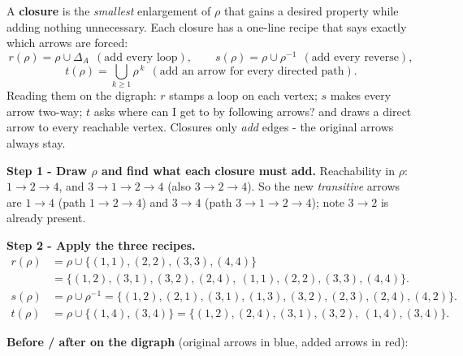 \documentclass[11pt,a4paper]{article}
\begin{document}
\begin{ideabox}
A \textbf{closure} is the \emph{smallest} enlargement of $\rho$ that gains a desired property while
adding nothing unnecessary. Each closure has a one-line recipe that says exactly which arrows are
\textquotedbl{}forced\textquotedbl{}:
\[
r(\rho)=\rho\cup\Delta_A\ \ (\text{add every loop}),\qquad
s(\rho)=\rho\cup\rho^{-1}\ \ (\text{add every reverse}),
\]
\[
t(\rho)=\bigcup_{k\ge1}\rho^{\,k}\ \ (\text{add an arrow for every directed path}).
\]
Reading them on the digraph: $r$ stamps a loop on each vertex; $s$ makes every arrow two-way; $t$
asks \textquotedbl{}where can I get to by following arrows?\textquotedbl{} and draws a direct arrow
to every reachable vertex. Closures only \emph{add} edges - the original arrows always stay.
\end{ideabox}

\textbf{Step 1 - Draw $\rho$ and find what each closure must add.}
Reachability in $\rho$: $1\to2\to4$, and $3\to1\to2\to4$ (also $3\to2\to4$).
So the new \emph{transitive} arrows are $1\to4$ (path $1\to2\to4$) and $3\to4$ (path $3\to1\to2\to4$);
note $3\to2$ is already present.

\textbf{Step 2 - Apply the three recipes.}
\begin{align*}
r(\rho)&=\rho\cup\{(1,1),(2,2),(3,3),(4,4)\}\\
&=\{(1,2),(3,1),(3,2),(2,4),\ (1,1),(2,2),(3,3),(4,4)\}.\\[3pt]
s(\rho)&=\rho\cup\rho^{-1}
=\{(1,2),(2,1),(3,1),(1,3),(3,2),(2,3),(2,4),(4,2)\}.\\[3pt]
t(\rho)&=\rho\cup\{(1,4),(3,4)\}
=\{(1,2),(2,4),(3,1),(3,2),\ (1,4),(3,4)\}.
\end{align*}

\textbf{Before / after on the digraph} (original arrows in blue, \textcolor{armRed}{added arrows in red}):
\end{document}
